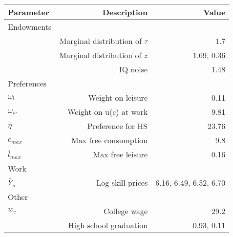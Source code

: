 \begin{tabular}{lrr}
\hline
Parameter & Description  & Value  \\ 
\hline
Endowments &   &   \\ 
 & Marginal distribution of $\tau$  & 1.7  \\ 
 & Marginal distribution of $z$  & 1.69, 0.36  \\ 
 & IQ noise  & 1.48  \\ 
Preferences &   &   \\ 
$\omega_{l}$ & Weight on leisure  & 0.11  \\ 
$\omega_{w}$ & Weight on u(c) at work  & 9.81  \\ 
$\bar{\eta}$ & Preference for HS  & 23.76  \\ 
$\bar{c}_{max}$ & Max free consumption  & 9.8  \\ 
$\bar{l}_{max}$ & Max free leisure  & 0.16  \\ 
Work &   &   \\ 
$\bar{Y}_{s}$ & Log skill prices  & 6.16, 6.49, 6.52, 6.70  \\ 
Other &   &   \\ 
$w_{c}$ & College wage  & 29.2  \\ 
 & High school graduation  & 0.93, 0.11  \\ 
\hline
\end{tabular}%
